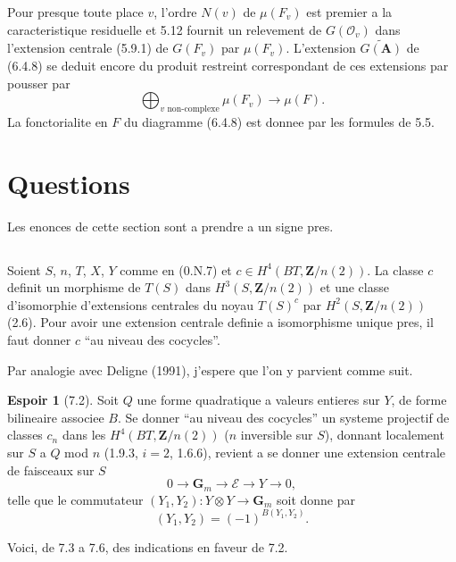 \documentclass[11pt,a4paper]{article}
\theoremstyle{plain}
\theoremstyle{definition}
\newtheorem{espoir}[theorem]{Espoir}
\begin{document}
Pour presque toute place $v$, l'ordre $N(v)$ de $\mu(F_v)$ est premier a la caracteristique residuelle et 5.12 fournit un relevement de $G(\mathcal{O}_v)$ dans l'extension centrale (5.9.1) de $G(F_v)$ par $\mu(F_v)$. L'extension $\widetilde{G(\mathbf{A})}$ de (6.4.8) se deduit encore du produit restreint correspondant de ces extensions par pousser par
\[
\bigoplus_{v \text{ non-complexe}} \mu(F_v) \to \mu(F).
\]
La fonctorialite en $F$ du diagramme (6.4.8) est donnee par les formules de 5.5.

\section{Questions}

Les enonces de cette section sont a prendre a un signe pres.

\subsection{}\label{7.1}

Soient $S$, $n$, $T$, $X$, $Y$ comme en (0.N.7) et $c \in H^4(BT, \mathbf{Z}/n(2))$. La classe $c$ definit un morphisme de $T(S)$ dans $H^3(S, \mathbf{Z}/n(2))$ et une classe d'isomorphie d'extensions centrales du noyau $T(S)^c$ par $H^2(S, \mathbf{Z}/n(2))$ (2.6). Pour avoir une extension centrale definie a isomorphisme unique pres, il faut donner $c$ ``au niveau des cocycles''.

Par analogie avec Deligne (1991), j'espere que l'on y parvient comme suit.

\begin{espoir}[7.2]\label{7.2}
Soit $Q$ une forme quadratique a valeurs entieres sur $Y$, de forme bilineaire associee $B$. Se donner ``au niveau des cocycles'' un systeme projectif de classes $c_n$ dans les $H^4(BT, \mathbf{Z}/n(2))$ ($n$ inversible sur $S$), donnant localement sur $S$ a $Q$ mod $n$ (1.9.3, $i = 2$, 1.6.6), revient a se donner une extension centrale de faisceaux sur $S$
\begin{equation}\label{7.2.1}
0 \to \mathbf{G}_m \to \mathscr{E} \to Y \to 0,
\end{equation}
telle que le commutateur $(Y_1, Y_2) : Y \otimes Y \to \mathbf{G}_m$ soit donne par
\begin{equation}\label{7.2.2}
(Y_1, Y_2) = (-1)^{B(Y_1, Y_2)}.
\end{equation}
\end{espoir}

Voici, de 7.3 a 7.6, des indications en faveur de 7.2.
\end{document}

